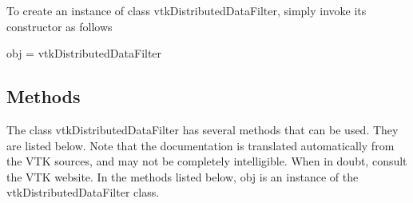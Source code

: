 To create an instance of class vtk\-Distributed\-Data\-Filter, simply invoke its constructor as follows \begin{DoxyVerb}  obj = vtkDistributedDataFilter
\end{DoxyVerb}
 \hypertarget{vtkwidgets_vtkxyplotwidget_Methods}{}\subsection{Methods}\label{vtkwidgets_vtkxyplotwidget_Methods}
The class vtk\-Distributed\-Data\-Filter has several methods that can be used. They are listed below. Note that the documentation is translated automatically from the V\-T\-K sources, and may not be completely intelligible. When in doubt, consult the V\-T\-K website. In the methods listed below, {\ttfamily obj} is an instance of the vtk\-Distributed\-Data\-Filter class. 
